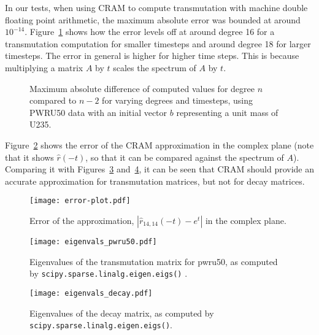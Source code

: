 In our tests, when using CRAM to compute transmutation with machine double
floating point arithmetic, the maximum absolute error was bounded at around
$10^{-14}$. Figure~\ref{fig:degrees} shows how the error levels off at around
degree 16 for a transmutation computation for smaller timesteps and around
degree 18 for larger timesteps. The error in general is higher for higher time
steps. This is because multiplying a matrix $A$ by $t$ scales the spectrum of
$A$ by $t$.

\begin{figure}[!ht]
\centering
\resizebox{0.9\textwidth}{!}{}
\caption{Maximum absolute difference of computed values for degree $n$
  compared to $n-2$ for varying degrees and timesteps, using PWRU50 data with
  an initial vector $b$ representing a unit mass of U235.}
\label{fig:degrees}
\end{figure}

Figure~\ref{fig:error-plot} shows the error of the CRAM approximation in the
complex plane (note that it shows $\hat{r}(-t)$, so that it can be compared
against the spectrum of $A$). Comparing it with
Figures~\ref{fig:eigenvals-pwru50} and~\ref{fig:eigenvals-decay}, it can be
seen that CRAM should provide an accurate approximation for transmutation
matrices, but not for decay matrices.

\begin{figure}[!ht]
\centering
\texttt{[image: error-plot.pdf]}
\caption{Error of the approximation, $\left |\hat{r}_{14,14}(-t) - e^{t}\right
  |$ in the complex plane. }
\label{fig:error-plot}
\end{figure}

\begin{figure}[!ht]
\centering
\texttt{[image: eigenvals\_pwru50.pdf]}
\caption{Eigenvalues of the transmutation matrix for pwru50, as computed by
  \texttt{scipy.\allowbreak{}sparse.\allowbreak{}linalg.\allowbreak{}eigen.\allowbreak{}eigs()}
  .}
\label{fig:eigenvals-pwru50}
\end{figure}

\begin{figure}[!ht]
\centering
\texttt{[image: eigenvals\_decay.pdf]}
\caption{Eigenvalues of the decay matrix, as computed by
  \texttt{scipy.\allowbreak{}sparse.\allowbreak{}linalg.\allowbreak{}eigen.\allowbreak{}eigs()}.}
\label{fig:eigenvals-decay}
\end{figure}
